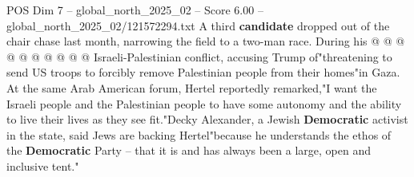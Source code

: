 \begin{textsample}{POS Dim 7 – global\_north\_2025\_02 – Score 6.00 – global\_north\_2025\_02/121572294.txt}
A third \textbf{candidate} dropped out of the chair chase last month, narrowing the field to a two-man race.
During his @ @ @ @ @ @ @ @ @ @ Israeli-Palestinian conflict, accusing Trump of"threatening to send US troops to forcibly remove Palestinian people from their homes"in Gaza.
At the same Arab American forum, Hertel reportedly remarked,"I want the Israeli people and the Palestinian people to have some autonomy and the ability to live their lives as they see fit."Decky Alexander, a Jewish \textbf{Democratic} activist in the state, said Jews are backing Hertel"because he understands the ethos of the \textbf{Democratic} Party -- that it is and has always been a large, open and inclusive tent."

\end{textsample}
